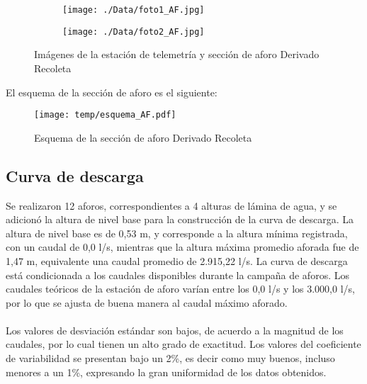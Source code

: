 \documentclass[]{article}
\begin{document}
\begin{figure}[H]
  \centering
\begin{subfigure}{.49\textwidth}
  \texttt{[image: ./Data/foto1\_AF.jpg]}
\end{subfigure}
\hfill
\begin{subfigure}{.49\textwidth}
  \texttt{[image: ./Data/foto2\_AF.jpg]}
\end{subfigure}
\caption{Imágenes de la estación de telemetría y sección de aforo Derivado Recoleta}
\label{fig:fotos_6}
\end{figure}

El esquema de la sección de aforo es el siguiente:

\begin{figure}[H]
  \centering
  \texttt{[image: temp/esquema\_AF.pdf]}
\caption{Esquema de la sección de aforo Derivado Recoleta}
\label{fig:Esquema_AF}
\end{figure}

\subsection{Curva de descarga}\label{curva-de-descarga-5}

Se realizaron 12 aforos, correspondientes a 4 alturas de lámina de agua, y se adicionó la altura de nivel base para la construcción de la curva de descarga. La altura de nivel base es de 0,53 m, y corresponde a la altura mínima registrada, con un caudal de 0,0 l/s, mientras que la altura máxima promedio aforada fue de 1,47 m, equivalente una caudal promedio de 2.915,22 l/s. La curva de descarga está condicionada a los caudales disponibles durante la campaña de aforos. Los caudales teóricos de la estación de aforo varían entre los 0,0 l/s y los 3.000,0 l/s, por lo que se ajusta de buena manera al caudal máximo aforado.\\
\\
Los valores de desviación estándar son bajos, de acuerdo a la magnitud de los caudales, por lo cual tienen un alto grado de exactitud. Los valores del coeficiente de variabilidad se presentan bajo un 2\%, es decir como muy buenos, incluso menores a un 1\%, expresando la gran uniformidad de los datos obtenidos.
\end{document}

